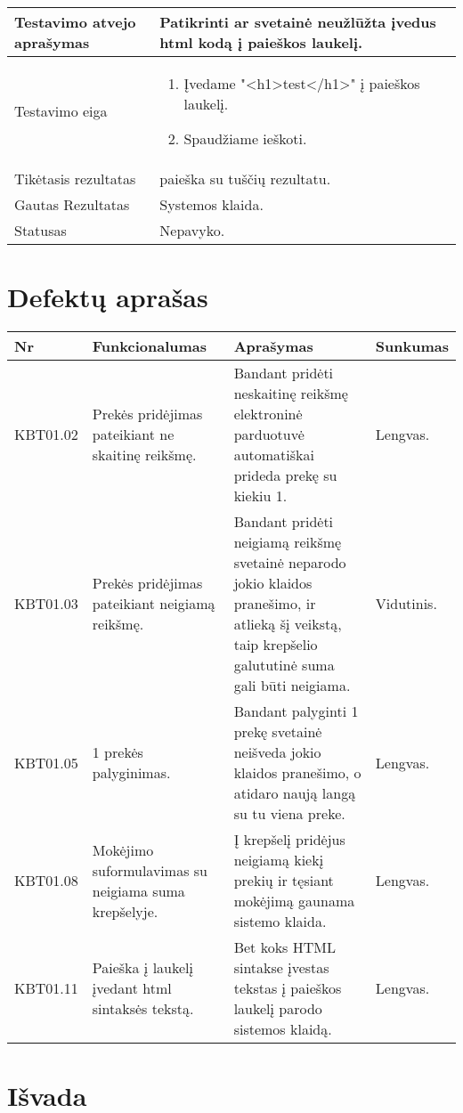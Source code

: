 \documentclass{VUMIFPSkursinis}
\begin{document}
\begin{center}
\begin{tabular}{ |p{5cm}|p{10cm}|}
	Testavimo atvejo aprašymas & Patikrinti ar svetainė neužlūžta įvedus html kodą į paieškos laukelį. \\ \hline
	Testavimo eiga & 
	\begin{enumerate}
	\item Įvedame "<h1>test</h1>" į paieškos laukelį.
	\item Spaudžiame ieškoti.
	\end{enumerate} \\ \hline
	Tikėtasis rezultatas & paieška su tuščių rezultatu. \\ \hline
	Gautas Rezultatas & Systemos klaida. \\ \hline
	Statusas & Nepavyko. \\ \hline
	\end{tabular}
\vspace{1cm}
\end{center}
\newpage
\section{Defektų aprašas}
\begin{center}
\begin{tabular}{ |p{1.8cm}| p{4cm} | p{7cm} | p{2cm} |}
	\hline
	Nr &  Funkcionalumas & Aprašymas & Sunkumas \\ \hline
	KBT01.02 & Prekės pridėjimas pateikiant ne skaitinę reikšmę. & Bandant pridėti neskaitinę reikšmę elektroninė parduotuvė automatiškai prideda prekę su kiekiu 1. & Lengvas. \\ \hline
	KBT01.03 & Prekės pridėjimas pateikiant neigiamą reikšmę. & Bandant pridėti neigiamą reikšmę svetainė neparodo jokio klaidos pranešimo, ir atlieką šį veikstą, taip krepšelio galututinė suma gali būti neigiama. & Vidutinis. \\ \hline
	KBT01.05 & 1 prekės palyginimas. & Bandant palyginti 1 prekę svetainė neišveda jokio klaidos pranešimo, o atidaro naują langą su tu viena preke. & Lengvas. \\ \hline
	KBT01.08 & Mokėjimo suformulavimas su neigiama suma krepšelyje. & Į krepšelį pridėjus neigiamą kiekį prekių ir tęsiant mokėjimą gaunama sistemo klaida. & Lengvas. \\ \hline
	KBT01.11 & Paieška į laukelį įvedant html sintaksės tekstą. & Bet koks HTML sintakse įvestas tekstas į paieškos laukelį parodo sistemos klaidą. & Lengvas. \\ \hline
\end{tabular}
\end{center}
\section{Išvada}
\end{document}
